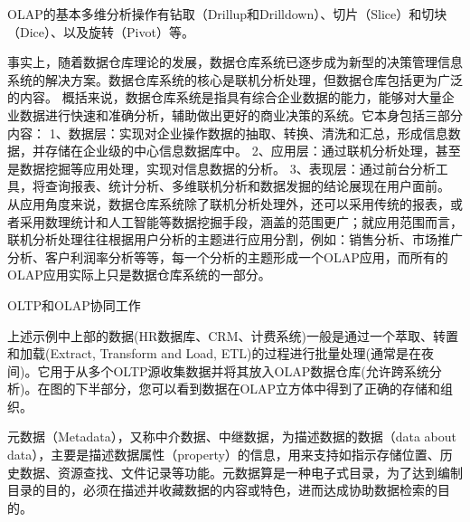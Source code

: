 \documentclass[letterpaper,12pt,english]{sphinxmanual}
\begin{document}
OLAP的基本多维分析操作有钻取（Drill\sphinxhyphen{}up和Drill\sphinxhyphen{}down）、切片（Slice）和切块（Dice）、以及旋转（Pivot）等。

事实上，随着数据仓库理论的发展，数据仓库系统已逐步成为新型的决策管理信息系统的解决方案。数据仓库系统的核心是联机分析处理，但数据仓库包括更为广泛的内容。
概括来说，数据仓库系统是指具有综合企业数据的能力，能够对大量企业数据进行快速和准确分析，辅助做出更好的商业决策的系统。它本身包括三部分内容：
1、数据层：实现对企业操作数据的抽取、转换、清洗和汇总，形成信息数据，并存储在企业级的中心信息数据库中。
2、应用层：通过联机分析处理，甚至是数据挖掘等应用处理，实现对信息数据的分析。
3、表现层：通过前台分析工具，将查询报表、统计分析、多维联机分析和数据发掘的结论展现在用户面前。
从应用角度来说，数据仓库系统除了联机分析处理外，还可以采用传统的报表，或者采用数理统计和人工智能等数据挖掘手段，涵盖的范围更广；就应用范围而言，联机分析处理往往根据用户分析的主题进行应用分割，例如：销售分析、市场推广分析、客户利润率分析等等，每一个分析的主题形成一个OLAP应用，而所有的OLAP应用实际上只是数据仓库系统的一部分。


OLTP和OLAP协同工作

上述示例中上部的数据(HR数据库、CRM、计费系统)一般是通过一个萃取、转置和加载(Extract, Transform and Load, ETL)的过程进行批量处理(通常是在夜间)。它用于从多个OLTP源收集数据并将其放入OLAP数据仓库(允许跨系统分析)。在图的下半部分，您可以看到数据在OLAP立方体中得到了正确的存储和组织。







元数据（Metadata），又称中介数据、中继数据，为描述数据的数据（data about data），主要是描述数据属性（property）的信息，用来支持如指示存储位置、历史数据、资源查找、文件记录等功能。元数据算是一种电子式目录，为了达到编制目录的目的，必须在描述并收藏数据的内容或特色，进而达成协助数据检索的目的。
\end{document}
